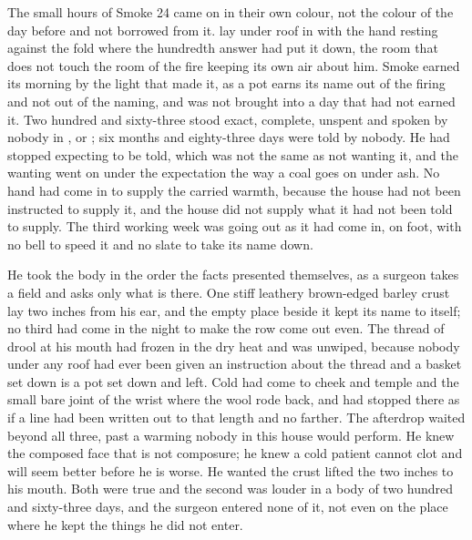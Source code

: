 
The small hours of Smoke 24 came on in their own colour, not the colour of the day before and not borrowed from it.  lay under  roof in  with the hand resting against the fold where the hundredth answer had put it down, the room that does not touch the room of the fire keeping its own air about him. Smoke earned its morning by the light that made it, as a pot earns its name out of the firing and not out of the naming, and was not brought into a day that had not earned it. Two hundred and sixty-three stood exact, complete, unspent and spoken by nobody in ,  or ; six months and eighty-three days were told by nobody. He had stopped expecting to be told, which was not the same as not wanting it, and the wanting went on under the expectation the way a coal goes on under ash. No hand had come in to supply the carried warmth, because the house had not been instructed to supply it, and the house did not supply what it had not been told to supply. The third working week was going out as it had come in, on foot, with no bell to speed it and no slate to take its name down.

He took the body in the order the facts presented themselves, as a surgeon takes a field and asks only what is there. One stiff leathery brown-edged barley crust lay two inches from his ear, and the empty place beside it kept its name to itself; no third had come in the night to make the row come out even. The thread of drool at his mouth had frozen in the dry heat and was unwiped, because nobody under any roof had ever been given an instruction about the thread and a basket set down is a pot set down and left. Cold had come to cheek and temple and the small bare joint of the wrist where the wool rode back, and had stopped there as if a line had been written out to that length and no farther. The afterdrop waited beyond all three, past a warming nobody in this house would perform. He knew the composed face that is not composure; he knew a cold patient cannot clot and will seem better before he is worse. He wanted the crust lifted the two inches to his mouth. Both were true and the second was louder in a body of two hundred and sixty-three days, and the surgeon entered none of it, not even on the place where he kept the things he did not enter.

